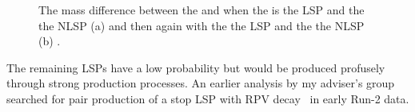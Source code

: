 \begin{figure}
\begin{subfigure}[b]{0.49\textwidth}
      \caption{}
      \label{fig:massdegb}
    \end{subfigure}
    \caption[The mass difference between the \chonepm and \none when the \none is the LSP and the \chonepm the NLSP (a) and then again with the \chonepm the LSP and the \none the NLSP (b)]{The mass difference between the \chonepm and \none when the \none is the LSP and the \chonepm the NLSP (a) and then again with the \chonepm the LSP and the \none the NLSP (b) \cite{Dumitru:2018nct}.}
    \label{fig:massdeg}
\end{figure}
The remaining LSPs have a low probability but would be produced profusely through strong production processes.
An earlier analysis by my adviser's group searched for pair production of a stop LSP with RPV decay~\cite{ATLAS:2017jvy} in early Run-2 data.


%
